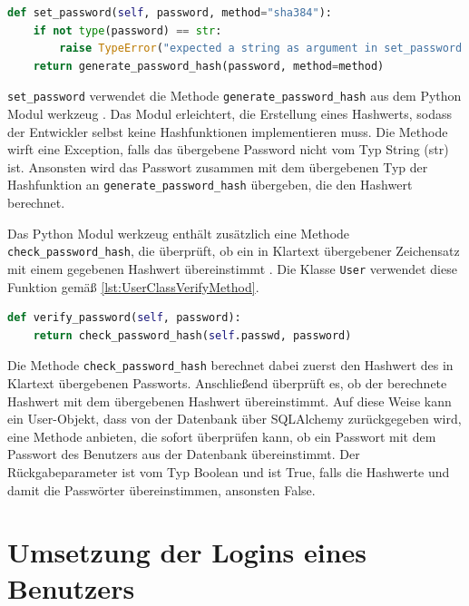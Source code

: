 \documentclass[a4paper,titlepage,halfparskip,12pt]{scrreprt}
\begin{document}
\begin{onehalfspacing}
\begin{lstlisting}[language=python, caption={Methode zur Berechnung des Password Hashes}, label={lst:UserMethodPasswordHash}]
def set_password(self, password, method="sha384"):
    if not type(password) == str:
        raise TypeError("expected a string as argument in set_password function.")
    return generate_password_hash(password, method=method)
\end{lstlisting}

\texttt{set\_password} verwendet die Methode \texttt{generate\_password\_hash} aus dem Python Modul werkzeug \cite{werkzeugDoc}. Das Modul erleichtert, die Erstellung eines Hashwerts, sodass der Entwickler selbst keine Hashfunktionen implementieren muss. Die Methode wirft eine Exception, falls das übergebene Password nicht vom Typ String (str) ist. Ansonsten wird das Passwort zusammen mit dem übergebenen Typ der Hashfunktion an \texttt{generate\_password\_hash} übergeben, die den Hashwert berechnet.

Das Python Modul werkzeug enthält zusätzlich eine Methode \texttt{check\_password\_hash}, die überprüft, ob ein in Klartext übergebener Zeichensatz mit einem gegebenen Hashwert übereinstimmt \cite{werkzeugDoc}. Die Klasse \texttt{User} verwendet diese Funktion gemäß \autoref{lst:UserClassVerifyMethod}.

\bigskip

\begin{lstlisting}[language=python, caption={Methode zur Überprüfung auf Übereinstimmung eines Zeichensatzes mit einem übergebenen Hashwert}, label={lst:UserClassVerifyMethod}]
def verify_password(self, password):
    return check_password_hash(self.passwd, password)
\end{lstlisting}

Die Methode \texttt{check\_password\_hash} berechnet dabei zuerst den Hashwert des in Klartext übergebenen Passworts. Anschließend überprüft es, ob der berechnete Hashwert mit dem übergebenen Hashwert übereinstimmt. Auf diese Weise kann ein User-Objekt, dass von der Datenbank über SQLAlchemy zurückgegeben wird, eine Methode anbieten, die sofort überprüfen kann, ob ein Passwort mit dem Passwort des Benutzers aus der Datenbank übereinstimmt. Der Rückgabeparameter ist vom Typ Boolean und ist True, falls die Hashwerte und damit die Passwörter übereinstimmen, ansonsten False.

\section{Umsetzung der Logins eines Benutzers}


\end{onehalfspacing}
\end{document}
